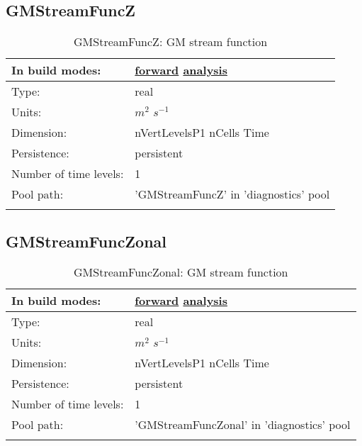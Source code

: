 \subsection[GMStreamFuncZ]{GMStreamFuncZ}
\label{subsec:var_sec_diagnostics_GMStreamFuncZ}
\begin{center}
\begin{longtable}{| p{2.0in} | p{4.0in} |}
        \hline 
        In build modes: & \hyperref[subsec:forward_var_tab_diagnostics]{forward} \hyperref[subsec:analysis_var_tab_diagnostics]{analysis} \\
        \hline 
        Type: & real \\
        \hline 
        Units: & $m^2$ $s^{-1}$ \\
        \hline 
        Dimension: & nVertLevelsP1 nCells Time \\
        \hline 
        Persistence: & persistent \\
        \hline 
        Number of time levels: & 1 \\
        \hline 
            Pool path: & 'GMStreamFuncZ' in 'diagnostics' pool
 \\
		 \hline 
    \caption{GMStreamFuncZ: GM stream function}
\end{longtable}
\end{center}
\subsection[GMStreamFuncZonal]{GMStreamFuncZonal}
\label{subsec:var_sec_diagnostics_GMStreamFuncZonal}
\begin{center}
\begin{longtable}{| p{2.0in} | p{4.0in} |}
        \hline 
        In build modes: & \hyperref[subsec:forward_var_tab_diagnostics]{forward} \hyperref[subsec:analysis_var_tab_diagnostics]{analysis} \\
        \hline 
        Type: & real \\
        \hline 
        Units: & $m^2$ $s^{-1}$ \\
        \hline 
        Dimension: & nVertLevelsP1 nCells Time \\
        \hline 
        Persistence: & persistent \\
        \hline 
        Number of time levels: & 1 \\
        \hline 
            Pool path: & 'GMStreamFuncZonal' in 'diagnostics' pool
 \\
		 \hline 
    \caption{GMStreamFuncZonal: GM stream function}
\end{longtable}
\end{center}

